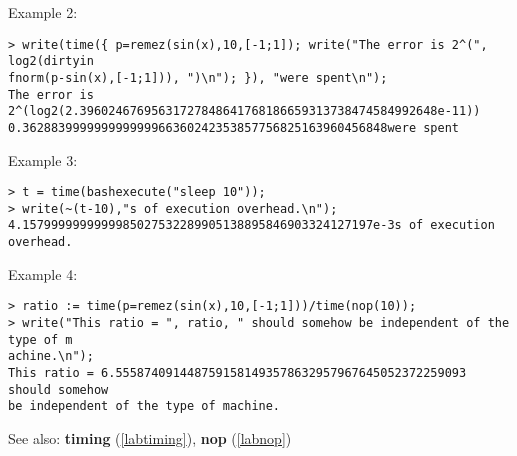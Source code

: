 \noindent Example 2: 
\begin{center}\begin{minipage}{15cm}\begin{Verbatim}[frame=single]
> write(time({ p=remez(sin(x),10,[-1;1]); write("The error is 2^(", log2(dirtyin
fnorm(p-sin(x),[-1;1])), ")\n"); }), "were spent\n");
The error is 2^(log2(2.39602467695631727848641768186659313738474584992648e-11))
0.362883999999999999966360242353857756825163960456848were spent
\end{Verbatim}
\end{minipage}\end{center}
\noindent Example 3: 
\begin{center}\begin{minipage}{15cm}\begin{Verbatim}[frame=single]
> t = time(bashexecute("sleep 10"));
> write(~(t-10),"s of execution overhead.\n");
4.1579999999999985027532289905138895846903324127197e-3s of execution overhead.
\end{Verbatim}
\end{minipage}\end{center}
\noindent Example 4: 
\begin{center}\begin{minipage}{15cm}\begin{Verbatim}[frame=single]
> ratio := time(p=remez(sin(x),10,[-1;1]))/time(nop(10));
> write("This ratio = ", ratio, " should somehow be independent of the type of m
achine.\n");
This ratio = 6.5558740914487591581493578632957967645052372259093 should somehow 
be independent of the type of machine.
\end{Verbatim}
\end{minipage}\end{center}
See also: \textbf{timing} (\ref{labtiming}), \textbf{nop} (\ref{labnop})
